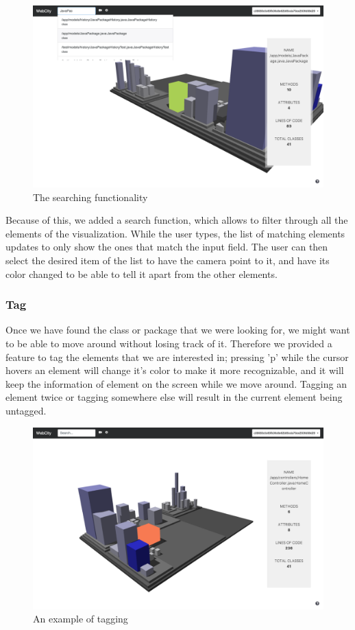 \documentclass[]{usiinfbachelorproject}
\begin{document}
\begin{figure} [H]
\centering
\includegraphics[width=1\textwidth]{pictures/search.png}
\caption{The searching functionality}
\label{fig:search}
\end{figure}


Because of this, we added a search function, which allows to filter through all the elements of the visualization. While the user types,
the list of matching elements updates to only show the ones that match the input field. The user can then select the desired item of the list to have the camera point to it,
and have its color changed to be able to tell it apart from the other elements.

\subsubsection{Tag} \label{Tag}
Once we have found the class or package that we were looking for, we might want to be able to move around without losing track of it. Therefore we provided a feature to tag the elements
that we are interested in; pressing 'p' while the cursor hovers an element will change it's color to make it more recognizable, and it will keep the information of element on the screen
while we move around. Tagging an element twice or tagging somewhere else will result in the current element being untagged.

\begin{figure} [H]
\centering
\includegraphics[width=1\textwidth]{pictures/tag.png}
\caption{An example of tagging}
\label{fig:tag}
\end{figure}
\end{document}
